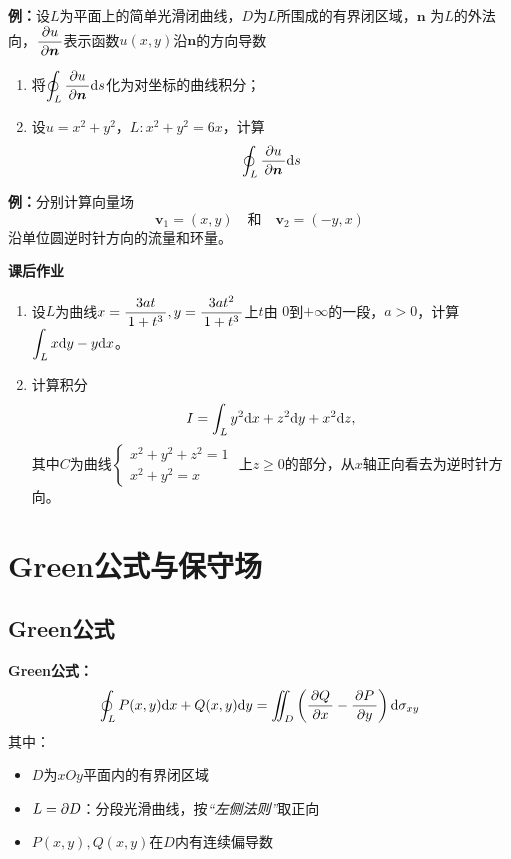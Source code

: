 {\bf 例：}设$L$为平面上的简单光滑闭曲线，$D$为$L$所围成的有界闭区域，$\bm{n}$
为$L$的外法向，$\displaystyle\frac{\,{\partial u}\,}{\,{\partial\bm{n}}\,}$表示函数$u(x,y)$沿$\bm{n}$的方向导数
\begin{enumerate}[(1)]
  \item 将$\displaystyle\oint_L\displaystyle\frac{\,{\partial u}\,}{\,{\partial\bm{n}}\,}\mathrm{d} s$化为对坐标的曲线积分；
  \item 设$u=x^2+y^2$，$L:x^2+y^2=6x$，计算
  $$\displaystyle\oint_L\displaystyle\frac{\,{\partial u}\,}{\,{\partial\bm{n}}\,}\mathrm{d} s$$
\end{enumerate}

{\bf 例：}分别计算向量场
$$\bm{v}_1=(x,y)\quad\mbox{和}\quad \bm{v}_2=(-y,x)$$
沿单位圆逆时针方向的流量和环量。

\begin{ext}
	{\bf 课后作业}
	\begin{enumerate}
	  \item 设$L$为曲线$x=\displaystyle\frac{\,{3at}\,}{\,{1+t^3}\,},y=\displaystyle\frac{\,{3at^2}\,}{\,{1+t^3}\,}$上$t$由
	  $0$到$+\infty$的一段，$a>0$，计算$\displaystyle\int_Lx\mathrm{d} y-y\mathrm{d} x$。
	  \item 计算积分
		$$I=\int_Ly^2\mathrm{d} x+z^2\mathrm{d} y+x^2\mathrm{d} z,$$
		其中$C$为曲线$\left\{\begin{array}{l}
		x^2+y^2+z^2=1 \\ x^2+y^2=x
		\end{array}\right.$
		上$z\geq 0$的部分，从$x$轴正向看去为逆时针方向。
	\end{enumerate}
\end{ext}

\section{Green公式与保守场}

\subsection{Green公式}

\begin{thx}
	{\bf Green公式：}
	$$\oint_LP(x,y)\mathrm{d} x+Q(x,y)\mathrm{d} y=\iint_D\left(
	\displaystyle\frac{\,{\partial Q}\,}{\,{\partial x}\,}-\displaystyle\frac{\,{\partial P}\,}{\,{\partial y}\,}\right)\mathrm{d}\sigma_{xy}$$
	其中：
	\begin{itemize}
	  \item $D$为$xOy$平面内的有界闭区域
	  \item $L=\partial D$：分段光滑曲线，按{\it “左侧法则”}取正向
	  \item $P(x,y),Q(x,y)$在$D$内有连续偏导数
	\end{itemize}
\end{thx}

